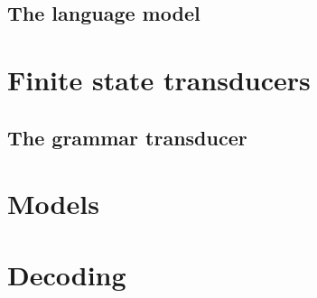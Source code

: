 \documentclass[12pt]{article}
\begin{document}
\subsection{The language model}


\section{Finite state transducers}\label{fst}

\subsection{The grammar transducer}

\section{Models}\label{model}
\section{Decoding}\label{decode}



\end{document}
